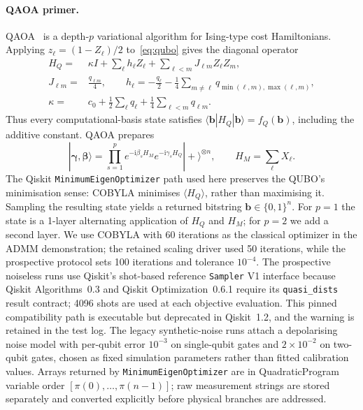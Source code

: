 \documentclass[5p,twocolumn,number,sort&compress,nopreprintline]{elsarticle}
\begin{document}
\paragraph{QAOA primer.}
QAOA~\cite{farhi2014qaoa} is a depth-$p$ variational algorithm for
Ising-type cost Hamiltonians. Applying
$z_\ell=(1-Z_\ell)/2$ to~\eqref{eq:qubo} gives the diagonal operator
\begin{subequations}\label{eq:qubo-ising}
\begin{align}
H_Q={}&\kappa I+\sum_\ell h_\ell Z_\ell
+\sum_{\ell<m}J_{\ell m}Z_\ell Z_m,\\
J_{\ell m}={}&\frac{q_{\ell m}}{4},\qquad
h_\ell=-\frac{q_\ell}{2}
-\frac14\sum_{m\ne\ell}q_{\min(\ell,m),\max(\ell,m)},\\
\kappa={}&c_0+\frac12\sum_\ell q_\ell
+\frac14\sum_{\ell<m}q_{\ell m}.
\end{align}
\end{subequations}
Thus every computational-basis state satisfies
$\langle\boldsymbol b|H_Q|\boldsymbol b\rangle=f_Q(\boldsymbol b)$,
including the additive constant. QAOA prepares
\begin{equation}
|\boldsymbol\gamma,\boldsymbol\beta\rangle
=\prod_{s=1}^{p}e^{-\mathrm i\beta_sH_M}
e^{-\mathrm i\gamma_sH_Q}|+\rangle^{\otimes n},
\qquad H_M=\sum_\ell X_\ell.
\end{equation}
The Qiskit \texttt{MinimumEigenOptimizer} path used here preserves the
QUBO's minimisation sense: COBYLA minimises
$\langle H_Q\rangle$, rather than maximising it. Sampling the resulting
state yields a returned bitstring $\boldsymbol b\in\{0,1\}^n$. For
$p=1$ the state is a 1-layer
alternating application of $H_Q$ and $H_M$; for $p=2$ we add a
second layer. We use COBYLA with $60$ iterations as the classical
optimizer in the ADMM demonstration; the retained scaling driver used
50 iterations, while the prospective protocol sets 100 iterations and
tolerance $10^{-4}$. The prospective noiseless runs use Qiskit's
shot-based reference \texttt{Sampler} V1 interface because Qiskit
Algorithms~0.3 and Qiskit Optimization~0.6.1 require its
\texttt{quasi\_dists} result contract; 4096 shots are used at each
objective evaluation. This pinned compatibility path is executable but
deprecated in Qiskit~1.2, and the warning is retained in the test log.
The legacy synthetic-noise runs attach a
depolarising noise model with per-qubit error $10^{-3}$ on
single-qubit gates and $2 \times 10^{-2}$ on two-qubit gates,
chosen as fixed simulation parameters rather than fitted calibration
values. Arrays returned by \texttt{MinimumEigenOptimizer} are in
QuadraticProgram variable order $[\pi(0),\ldots,\pi(n-1)]$; raw
measurement strings are stored separately and converted explicitly
before physical branches are addressed.
\end{document}
